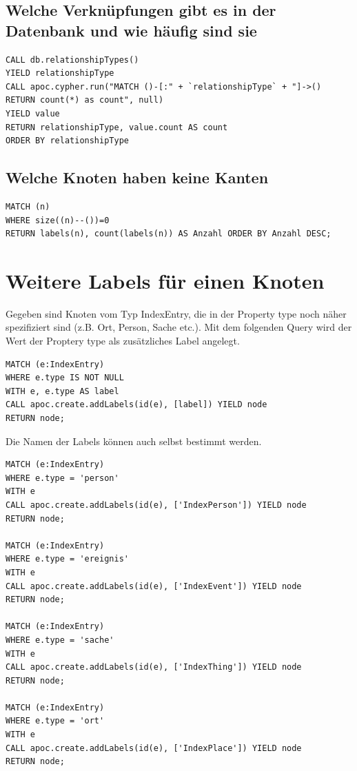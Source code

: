 \documentclass[ngerman,]{scrreprt}
\begin{document}
\subsection{Welche Verknüpfungen gibt es in der Datenbank und wie häufig sind sie}\label{welche-verknuxfcpfungen-gibt-es-in-der-datenbank-und-wie-huxe4ufig-sind-sie}

\begin{verbatim}
CALL db.relationshipTypes()
YIELD relationshipType
CALL apoc.cypher.run("MATCH ()-[:" + `relationshipType` + "]->()
RETURN count(*) as count", null)
YIELD value
RETURN relationshipType, value.count AS count
ORDER BY relationshipType
\end{verbatim}

\subsection{Welche Knoten haben keine Kanten}\label{welche-knoten-haben-keine-kanten}

\begin{verbatim}
MATCH (n)
WHERE size((n)--())=0
RETURN labels(n), count(labels(n)) AS Anzahl ORDER BY Anzahl DESC;
\end{verbatim}

\section{Weitere Labels für einen Knoten}\label{weitere-labels-fuxfcr-einen-knoten}

Gegeben sind Knoten vom Typ IndexEntry, die in der Property type noch näher spezifiziert sind (z.B. Ort, Person, Sache etc.). Mit dem folgenden Query wird der Wert der Proptery type als zusätzliches Label angelegt.

\begin{verbatim}
MATCH (e:IndexEntry)
WHERE e.type IS NOT NULL
WITH e, e.type AS label
CALL apoc.create.addLabels(id(e), [label]) YIELD node
RETURN node;
\end{verbatim}

Die Namen der Labels können auch selbst bestimmt werden.

\begin{verbatim}
MATCH (e:IndexEntry)
WHERE e.type = 'person'
WITH e
CALL apoc.create.addLabels(id(e), ['IndexPerson']) YIELD node
RETURN node;

MATCH (e:IndexEntry)
WHERE e.type = 'ereignis'
WITH e
CALL apoc.create.addLabels(id(e), ['IndexEvent']) YIELD node
RETURN node;

MATCH (e:IndexEntry)
WHERE e.type = 'sache'
WITH e
CALL apoc.create.addLabels(id(e), ['IndexThing']) YIELD node
RETURN node;

MATCH (e:IndexEntry)
WHERE e.type = 'ort'
WITH e
CALL apoc.create.addLabels(id(e), ['IndexPlace']) YIELD node
RETURN node;
\end{verbatim}
\end{document}
